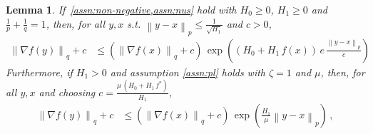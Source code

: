 \documentclass{article}
\newtheorem{lemma}{Lemma}
\newcommand{\norm}[1]{\left\|#1 \right\|}
\begin{document}
\begin{lemma}
If~\cref{assn:non-negative,assn:nus} hold with $H_0 \geq 0$, $H_1 \geq 0$ and $\frac{1}{p} + \frac{1}{q} = 1$, then, for all $y, x$ s.t. $\norm{y - x}_p \leq \frac{1}{\sqrt{H_1}}$ and $c > 0$, 
\begin{align*}
\norm{\nabla f(y)}_q  + c & \leq \left(\norm{\nabla f(x)}_q + c \right) \, \exp\left((H_0 + H_1 \, f(x)) \, e \, \frac{\norm{y - x}_p}{c} \right) 
\end{align*}
\label{lemma:grad-multi-lip-gen}
Furthermore, if $H_1 > 0$ and assumption \ref{assn:pl} holds with $\zeta = 1$ and $\mu$, then, for all $y, x$ and choosing $c = \frac{\mu \, (H_0 + H_1 \, f^*)}{H_1}$,
\begin{align*}
\norm{\nabla f(y)}_q + c & \leq \left(\norm{\nabla f(x)}_q + c \right) \,  \exp \left(\frac{H_1}{\mu} \norm{y - x}_{p} \right) \,,
\end{align*}
\end{lemma}
\end{document}
